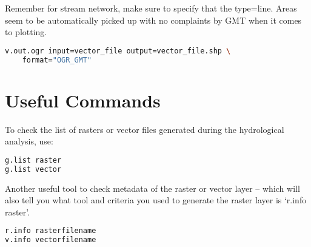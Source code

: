 Remember for stream network, make sure to specify that the type=line. Areas seem to be automatically picked up with no complaints by GMT when it comes to plotting.

\begin{lstlisting}[language=bash]
v.out.ogr input=vector_file output=vector_file.shp \
	format="OGR_GMT"
\end{lstlisting} 

\section{Useful Commands}

To check the list of rasters or vector files generated during the hydrological analysis, use:

\begin{lstlisting}[language=bash]
g.list raster
g.list vector
\end{lstlisting} 

Another useful tool to check metadata of the raster or vector layer – which will also tell you what tool and criteria you used to generate the raster layer is ‘r.info raster’.

\begin{lstlisting}[language=bash]
r.info rasterfilename
v.info vectorfilename
\end{lstlisting} 






